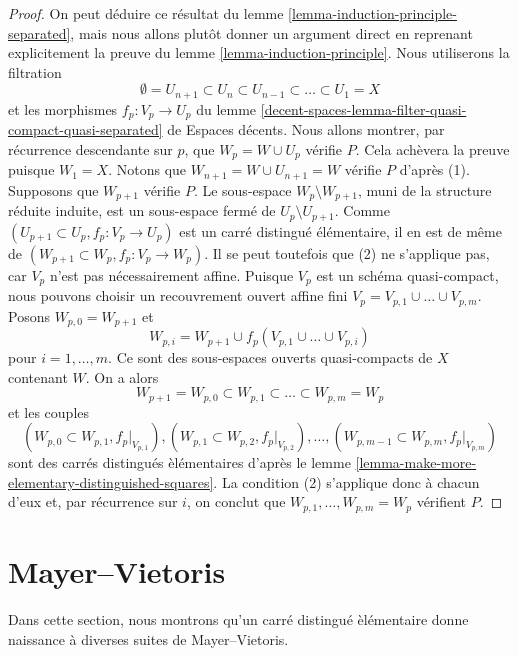\begin{proof}
On peut d\'eduire ce r\'esultat du
lemme \ref{lemma-induction-principle-separated}, mais nous allons plut\^ot
donner un argument direct en reprenant explicitement la preuve du
lemme \ref{lemma-induction-principle}. Nous utiliserons la filtration
$$
\emptyset = U_{n + 1} \subset
U_n \subset U_{n - 1} \subset \ldots \subset U_1 = X
$$
et les morphismes $f_p : V_p \to U_p$ du lemme
\ref{decent-spaces-lemma-filter-quasi-compact-quasi-separated} de
Espaces décents. Nous allons montrer, par r\'ecurrence descendante sur $p$,
que $W_p = W \cup U_p$ v\'erifie $P$. Cela ach\`evera la preuve puisque
$W_1 = X$. Notons que $W_{n + 1} = W \cup U_{n + 1} = W$ v\'erifie $P$
d'apr\`es (1). Supposons que $W_{p + 1}$ v\'erifie $P$. Le sous-espace
$W_p \setminus W_{p + 1}$, muni de la structure r\'eduite induite, est un
sous-espace ferm\'e de $U_p \setminus U_{p + 1}$.
Comme $(U_{p + 1} \subset U_p, f_p : V_p \to U_p)$ est un carr\'e distingu\'e
\'el\'ementaire, il en est de m\^eme de
$(W_{p + 1} \subset W_p, f_p : V_p \to W_p)$.
Il se peut toutefois que (2) ne s'applique pas, car $V_p$ n'est pas
n\'ecessairement affine. Puisque $V_p$ est un sch\'ema quasi-compact, nous
pouvons choisir un recouvrement ouvert affine fini
$V_p = V_{p, 1} \cup \ldots \cup V_{p, m}$. Posons
$W_{p, 0} = W_{p + 1}$ et
$$
W_{p, i} = W_{p + 1} \cup f_p(V_{p, 1} \cup \ldots \cup V_{p, i})
$$
pour $i = 1, \ldots, m$. Ce sont des sous-espaces ouverts quasi-compacts
de $X$ contenant $W$. On a alors
$$
W_{p + 1} = W_{p, 0} \subset
W_{p, 1} \subset \ldots \subset
W_{p, m} = W_p
$$
et les couples
$$
(W_{p, 0} \subset W_{p, 1}, f_p|_{V_{p, 1}}),
(W_{p, 1} \subset W_{p, 2}, f_p|_{V_{p, 2}}),\ldots,
(W_{p, m - 1} \subset W_{p, m}, f_p|_{V_{p, m}})
$$
sont des carr\'es distingu\'es \`el\'ementaires d'apr\`es le
lemme \ref{lemma-make-more-elementary-distinguished-squares}.
La condition (2) s'applique donc \`a chacun d'eux et, par r\'ecurrence sur
$i$, on conclut que $W_{p, 1}, \ldots, W_{p, m} = W_p$ v\'erifient $P$.
\end{proof}



\section{Mayer--Vietoris}
\label{section-mayer-vietoris}

\noindent
Dans cette section, nous montrons qu'un carr\'e distingu\'e \`el\'ementaire
donne naissance \`a diverses suites de Mayer--Vietoris.

